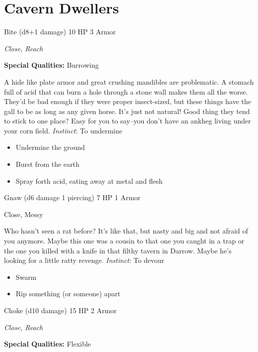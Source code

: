 \section{Cavern Dwellers}
\HRule
{}

Bite (d8+1 damage)\hspace*{\fill} 10 HP 3 Armor

\emph{Close, Reach}

\textbf{Special Qualities:}
Burrowing

\HRule
A hide like plate armor and great crushing mandibles are problematic. A stomach full of acid that can burn a hole through a stone wall makes them all the worse. They'd be bad enough if they were proper insect-sized, but these things have the gall to be as long as any given horse. It's just not natural! Good thing they tend to stick to one place? Easy for you to say--you don't have an ankheg living under your corn field. \emph{Instinct}: To undermine
\begin{itemize}
\item Undermine the ground
\item Burst from the earth
\item Spray forth acid, eating away at metal and flesh
\end{itemize}

\HRule
{}

Gnaw (d6 damage 1 piercing) \hspace*{\fill}7 HP 1 Armor

Close, Messy

\HRule
Who hasn't seen a rat before? It's like that, but nasty and big and not afraid of you anymore. Maybe this one was a cousin to that one you caught in a trap or the one you killed with a knife in that filthy tavern in Darrow. Maybe he's looking for a little ratty revenge. \emph{Instinct}: To devour
\begin{itemize}
\item Swarm
\item Rip something (or someone) apart
\end{itemize}
\newpage
\HRule
{}

Choke (d10 damage) \hspace*{\fill}15 HP 2 Armor

\emph{Close, Reach}

\textbf{Special Qualities:}
Flexible

